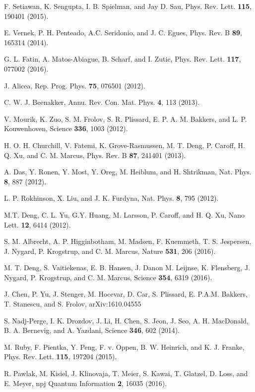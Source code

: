 \documentclass[prl,twocolumn,showpacs,floatfix,amsbsy,amsbsy,superscriptaddress]{revtex4-1}
\begin{document}
\begin{thebibliography}{99}
 F. Setiawan, K. Sengupta, I. B. Spielman, and Jay D. Sau, Phys. Rev. Lett. {\bf 115}, 190401 (2015).

 E. Vernek, P. H. Penteado, A.C. Seridonio, and J. C. Egues, Phys. Rev. B {\bf 89}, 165314 (2014).

 G. L. Fatin, A. Matos-Abiague, B. Scharf, and I. Zutic, Phys. Rev. Lett. {\bf 117}, 077002 (2016).

 J. Alicea, Rep. Prog. Phys. {\bf 75}, 076501 (2012).

 C. W. J. Beenakker, Annu. Rev. Con. Mat. Phys. {\bf 4}, 113 (2013). 

 V. Mourik, K. Zuo, S. M. Frolov, S. R. Plissard, E. P. A. M. Bakkers, and L. P. Kouwenhoven, Science {\bf 336}, 1003 (2012).

 H. O. H. Churchill, V. Fatemi, K. Grove-Rasmussen, M. T. Deng, P. Caroff, H. Q. Xu, and C. M. Marcus, Phys. Rev. B {\bf 87}, 241401 (2013).

 A. Das, Y. Ronen, Y. Most, Y. Oreg, M. Heiblum, and H. Shtrikman, Nat. Phys. {\bf 8}, 887 (2012).

 L. P. Rokhinson, X. Liu, and J. K. Furdyna, Nat. Phys. {\bf 8}, 795 (2012).

 M.T. Deng, C. L. Yu, G.Y. Huang, M. Larsson, P. Caroff, and H. Q. Xu, Nano Lett. {\bf 12}, 6414 (2012).

 S. M. Albrecht, A. P. Higginbotham, M. Madsen, F. Kuemmeth, T. S. Jespersen, J. Nygard, P. Krogstrup, and 
C. M. Marcus, Nature {\bf 531}, 206 (2016).

 M. T. Deng, S. Vaitiekenas, E. B. Hansen, J. Danon M. Leijnse, K. Flensberg, J. Nygard, P. Krogstrup, and C. M. Marcus, Science {\bf 354},  6319 (2016).

 J. Chen, P. Yu, J. Stenger, M. Hocevar, D. Car, S. Plissard, E. P.A.M. Bakkers, T. Stanescu, and S. Frolov, arXiv:1610.04555

 S. Nadj-Perge, I. K. Drozdov, J. Li, H. Chen, S. Jeon, J. Seo, A. H. MacDonald, B. A. Bernevig, and A. Yazdani, Science {\bf 346}, 602 (2014).

 M. Ruby, F. Pientka, Y. Peng, F. v. Oppen, B. W. Heinrich, and K. J. Franke, Phys. Rev. Lett. {\bf 115}, 197204 (2015).

 R. Pawlak, M. Kisiel, J. Klinovaja, T. Meier, S. Kawai, T. Glatzel, D. Loss, and E. Meyer, npj Quantum Information {\bf 2}, 16035 (2016).


\end{thebibliography}
\end{document}
